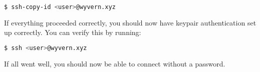 \begin{lstlisting}[language=bash]
$ ssh-copy-id <user>@wyvern.xyz
\end{lstlisting}

If everything proceeded correctly, you should now have keypair authentication set up correctly. You can verify this by running:

\begin{lstlisting}[language=bash]
$ ssh <user>@wyvern.xyz
\end{lstlisting}


If all went well, you should now be able to connect without a password.

\newpage
